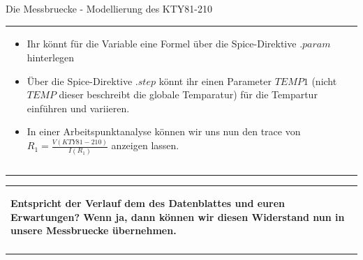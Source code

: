 \begin{frame}[t]{Die Messbruecke - Modellierung des KTY81-210}
\begin{spacing}{0.9}
\begin{tiny}
\begin{table}[h!]
\begin{tabular}{p{3cm} p{7cm}}
\begin{minipage}{.7\textwidth}
\begin{itemize}
                            \item Ihr könnt für die Variable eine Formel über die Spice-Direktive $.param$ hinterlegen
                            \item Über die Spice-Direktive $.step$ könnt ihr einen Parameter $TEMP1$ (nicht $TEMP$ dieser beschreibt die globale Temparatur) für die Tempartur einführen und variieren.
                            \item In einer Arbeitspunktanalyse können wir uns nun den trace von $R_1=\frac{V(KTY81-210)}{I(R_1)}$ anzeigen lassen.
                        \end{itemize}
                    \end{minipage}
                    \\\\\\
                \end{tabular}
                \begin{tabular}{p{10cm}}
                    \begin{minipage}{\textwidth}
                        \begin{center}
                            \textbf{Entspricht der Verlauf dem des Datenblattes und euren Erwartungen? \newline
                                Wenn ja, dann können wir diesen Widerstand nun in unsere Messbruecke übernehmen.}
                        \end{center}
                    \end{minipage}
                    \\ \\
                \end{tabular}
            \end{table}
        \end{tiny} \end{spacing}

\end{frame}